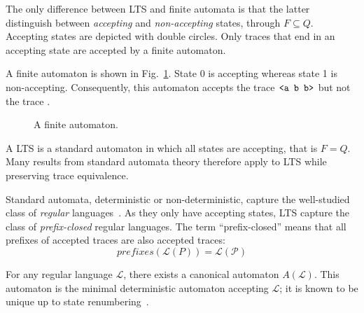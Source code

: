 The only difference between LTS and finite automata is that the latter distinguish between \emph{accepting} and \emph{non-accepting} states, through $F \subseteq Q$. Accepting states are depicted with double circles. Only traces that end in an accepting state are accepted by a finite automaton.

A finite automaton is shown in Fig.~\ref{image:finite-automaton}. State 0 is accepting whereas state 1 is non-accepting. Consequently, this automaton accepts the trace $\texttt{<a b b>}$ but not the trace .

\begin{figure}[H]
\centering{}
  \caption{A finite automaton\label{image:finite-automaton}.}
\end{figure}

A LTS is a standard automaton in which all states are accepting, that is $F = Q$. Many results from standard automata theory therefore apply to LTS while preserving trace equivalence.

Standard automata, deterministic or non-deterministic, capture the well-studied class of \emph{regular} languages~\cite{Hopcroft:1979}. As they only have accepting states, LTS capture the class of \emph{prefix-closed} regular languages. The term ``prefix-closed'' means that all prefixes of accepted traces are also accepted traces: 
\begin{equation*}
prefixes(\mathcal{L}(P)) = \mathcal{L(P)}
\end{equation*}

For any regular language $\mathcal{L}$, there exists a canonical automaton $A(\mathcal{L})$. This automaton is the minimal deterministic automaton accepting $\mathcal{L}$; it is known to be unique up to state renumbering~\cite{Hopcroft:1979}. 

